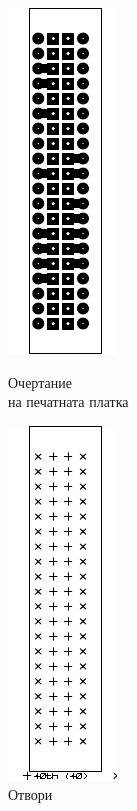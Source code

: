 \begin{figure}[!htb]
    \begin{minipage}{0.49\linewidth}
        \centering
        \includegraphics[page=7]{documents/dev_board.pdf}
        \caption{Очертание\\на печатната платка}
        \label{fig:dev_cont}
    \end{minipage}
    \hfill
    \begin{minipage}{0.49\linewidth}
        \centering
        \includegraphics[page=1]{documents/dev_board_drill.pdf}
        \caption{Отвори}
        \label{fig:dev_drill}
    \end{minipage}
\end{figure}
\FloatBarrier
